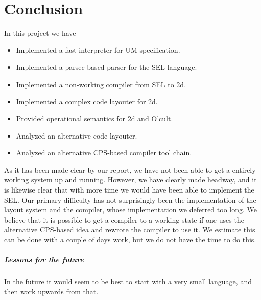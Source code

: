 \chapter*{Conclusion}

In this project we have
\begin{itemize}
\item Implemented a fast interpreter for UM specification.
\item Implemented a parsec-based parser for the SEL language.
\item Implemented a non-working compiler from SEL to 2d.
\item Implemented a complex code layouter for 2d.
\item Provided operational semantics for 2d and O'cult.
\item Analyzed an alternative code layouter.
\item Analyzed an alternative CPS-based compiler tool chain.
\end{itemize}

As it has been made clear by our report, we have not been able to get
a entirely working system up and running. However, we have clearly
made headway, and it is likewise clear that with more time we would
have been able to implement the SEL. Our primary difficulty has not surprisingly been the implementation of the layout system and the
compiler, whose implementation we deferred too long. We believe that
it is possible to get a compiler to a working state if one uses the
alternative CPS-based idea and rewrote the compiler to use it. We
estimate this can be done with a couple of days work, but we do not
have the time to do this.

\paragraph{Lessons for the future}
In the future it would seem to be best to start with a very small
language, and then work upwards from that.

